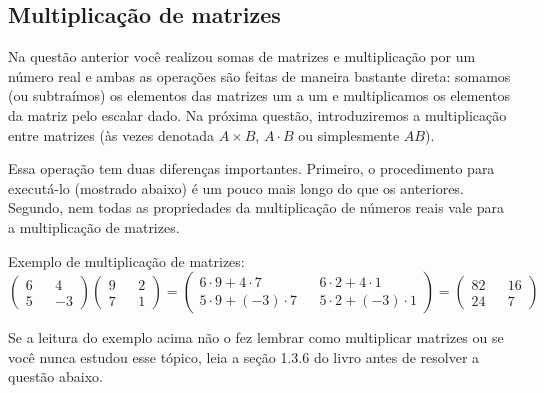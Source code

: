 \documentclass[main_estudante.tex]{subfiles}
\begin{document}
\subsection*{Multiplicação de matrizes}

Na questão anterior você realizou somas de matrizes e multiplicação por um número real e ambas as operações são feitas de maneira bastante direta: somamos (ou subtraímos) os elementos das matrizes um a um e multiplicamos os elementos da matriz pelo escalar dado. Na próxima questão, introduziremos a multiplicação entre matrizes (às vezes denotada $A \times B$, $A \cdot B$ ou simplesmente $AB$).

Essa operação tem duas diferenças importantes. Primeiro, o procedimento para executá-lo (mostrado abaixo) é um pouco mais longo do que os anteriores. Segundo, nem todas as propriedades da multiplicação de números reais vale para a multiplicação de matrizes.

\begin{caixaExemplo}
 \noindent  Exemplo de multiplicação de matrizes:
 $$ \begin{pmatrix} 6 && 4 \\ 5 && -3 \end{pmatrix} \begin{pmatrix} 9 && 2 \\ 7 && 1  \end{pmatrix} = \begin{pmatrix} 6 \cdot 9 + 4 \cdot 7 &&  6 \cdot2 + 4 \cdot 1 \\ 5 \cdot 9 + (-3) \cdot 7 && 5 \cdot 2 + (-3) \cdot 1 \end{pmatrix} = \begin{pmatrix} 82 &&  16 \\ 24 && 7 \end{pmatrix}$$
\end{caixaExemplo}

Se a leitura do exemplo acima não o fez lembrar como multiplicar matrizes ou se você nunca estudou esse tópico, leia a seção 1.3.6 do livro  antes de resolver a questão abaixo.
\end{document}
